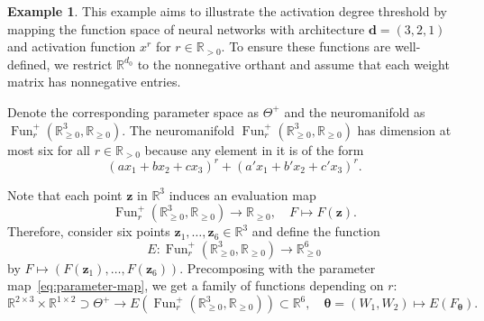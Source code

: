 \documentclass[12pt]{article}
\theoremstyle{definition}
\newtheorem{example}[theorem]{Example}
\DeclareMathOperator{\Fun}{Fun}
\newcommand{\btheta}{{\boldsymbol{\theta}}}
\newcommand{\bz}{\mathbf{z}} %
\begin{document}
\begin{example}\label{ex:three-two-one}
This example aims to illustrate the activation degree threshold by mapping the function space of neural networks with architecture $\mathbf{d} = (3,2,1)$ and activation function $x^r$ for $r\in \mathbb{R}_{>0}$. To ensure these functions are well-defined, we restrict $\mathbb{R}^{d_0}$ to the nonnegative orthant and assume that each weight matrix has nonnegative entries. 


Denote the corresponding parameter space as $\Theta^+$ and 
the neuromanifold as $\Fun^+_r\left(\mathbb{R}^{3}_{\geq 0},\mathbb{R}_{\geq0}\right)$. 
The neuromanifold 
$\Fun^+_r\left(\mathbb{R}^{3}_{\geq 0},\mathbb{R}_{\geq0}\right)$ 
has dimension at most six for all {$r\in \mathbb{R}_{>0}$}  
because any element in it is of the form 
\[
(ax_1+bx_2+cx_3)^r+(a'x_1+b'x_2+c'x_3)^r.
\]

Note that each point $\bz$ in $\mathbb{R}^{3}$ induces an evaluation map  
\[
\Fun_r^+\left(\mathbb{R}^{3}_{\geq 0},\mathbb{R}_{\geq 0}\right)\to\mathbb{R}_{\geq 0},
\quad 
 F\mapsto F(\bz).
\]
Therefore, consider six points $\bz_1,\dots,\bz_6\in\mathbb{R}^{3}$ and define the function \[
E: \Fun_r^+(\mathbb{R}_{\geq0}^3,\mathbb{R}_{\geq0})
\to \mathbb{R}_{\geq0}^6\] 
by
{$F\mapsto (F({\bz_1}),\dots,F({\bz_6}))$.}
Precomposing with the parameter map~\eqref{eq:parameter-map},
we get a family of functions depending on $r$:
\begin{equation}\label{eq:positive-map}
\mathbb{R}^{2\times 3}\times \mathbb{R}^{1\times 2}{\supset\Theta^+}\to
E\left(
\Fun_r^+(\mathbb{R}_{\geq0}^3,\mathbb{R}_{\geq0})\right)
\subset
\mathbb{R}^6,\quad
\btheta=(W_1,W_2)\mapsto 
E\left(F_\btheta\right).
\end{equation}



\end{example}
\end{document}
